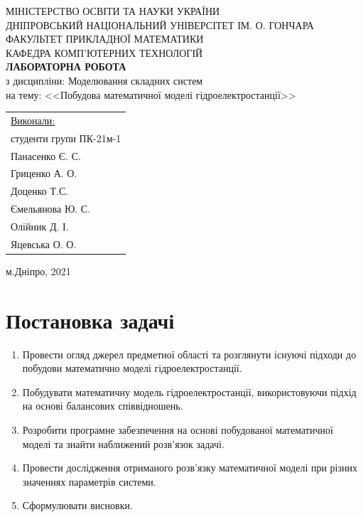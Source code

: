 \documentclass[12pt]{article}
\numberwithin{equation}{section}
\numberwithin{figure}{section}
\begin{document}
		\begin{center}
		\hfill \break
		\large{МІНІСТЕРСТВО ОСВІТИ ТА НАУКИ УКРАЇНИ} \\
		\large{ДНІПРОВСЬКИЙ НАЦІОНАЛЬНИЙ УНІВЕРСІТЕТ ІМ. О. ГОНЧАРА} \\
		\large{ФАКУЛЬТЕТ ПРИКЛАДНОЇ МАТЕМАТИКИ} \\
		\large{КАФЕДРА КОМП'ЮТЕРНИХ ТЕХНОЛОГІЙ} \\
		\hfill\break
		\hfill\break
		\hfill\break
		\hfill\break
		\large{\bfseries ЛАБОРАТОРНА РОБОТА} \\
		\normalsize{з дисципліни: Моделювання складних систем} \\
		\normalsize{на тему: <<Побудова математичної моделі гідроелектростанції>>} \\
		\end{center}
		
		\hfill\break
		\hfill\break
		\hfill\break
		\begin{flushright}
		\begin{tabular}{l}
		\underline{Виконали:} \\
		студенти групи ПК-21м-1 \\
		Панасенко Є. С. \\
		Гриценко А. О. \\
		Доценко Т.С.\\
		Ємельянова Ю. С. \\
		Олійник Д. І. \\
		Яцевська О. О. \\
		\end{tabular}
		\end{flushright}
		\hfill\break
		\hfill\break		
		\hfill\break
		\hfill\break
		\begin{center}
		м.Дніпро, 2021
		\end{center}	
        
\thispagestyle{empty}
	
\tableofcontents
	
\section{Постановка задачі}

\begin{enumerate}
	\item Провести огляд джерел предметної області та розглянути існуючі підходи до побудови математично моделі гідроелектростанції.
	\item Побудувати математичну модель гідроелектростанції, використовуючи підхід на основі балансових співвідношень.
	\item Розробити програмне забезпечення на основі побудованої математичної моделі та знайти наближений розв’язок задачі.
	\item Провести дослідження отриманого розв’язку математичної моделі при різних значеннях параметрів системи.
	\item Сформулювати висновки.  
\end{enumerate}
\end{document}
